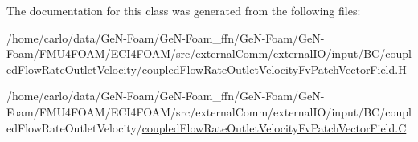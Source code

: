 The documentation for this class was generated from the following files\+:\begin{DoxyCompactItemize}
\item 
/home/carlo/data/\+Ge\+N-\/\+Foam/\+Ge\+N-\/\+Foam\+\_\+ffn/\+Ge\+N-\/\+Foam/\+Ge\+N-\/\+Foam/\+F\+M\+U4\+F\+O\+A\+M/\+E\+C\+I4\+F\+O\+A\+M/src/external\+Comm/external\+I\+O/input/\+B\+C/coupled\+Flow\+Rate\+Outlet\+Velocity/\hyperlink{coupledFlowRateOutletVelocityFvPatchVectorField_8H}{coupled\+Flow\+Rate\+Outlet\+Velocity\+Fv\+Patch\+Vector\+Field.\+H}\item 
/home/carlo/data/\+Ge\+N-\/\+Foam/\+Ge\+N-\/\+Foam\+\_\+ffn/\+Ge\+N-\/\+Foam/\+Ge\+N-\/\+Foam/\+F\+M\+U4\+F\+O\+A\+M/\+E\+C\+I4\+F\+O\+A\+M/src/external\+Comm/external\+I\+O/input/\+B\+C/coupled\+Flow\+Rate\+Outlet\+Velocity/\hyperlink{coupledFlowRateOutletVelocityFvPatchVectorField_8C}{coupled\+Flow\+Rate\+Outlet\+Velocity\+Fv\+Patch\+Vector\+Field.\+C}\end{DoxyCompactItemize}
